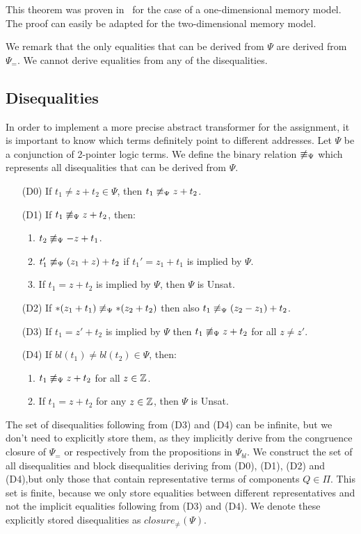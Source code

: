 This theorem was proven in~\cite{2pointer} for the case of a one-dimensional memory model.
The proof can easily be adapted for the two-dimensional memory model.

We remark that the only equalities that can be derived from $\Psi$ are derived from $\Psi_=$. We cannot derive equalities from any of the disequalities.

\subsection{Disequalities}\label{disequalities}

In order to implement a more precise abstract transformer for the assignment, it is important to know which terms definitely
point to different addresses. Let $\Psi$ be a conjunction of 2-pointer logic terms.
We define the binary relation $\not\equiv_\Psi$ which represents all disequalities that can be derived from $\Psi$.

\begin{enumerate}
  \item[(D0)] If $t_1 \neq z + t_2 \in \Psi$, then $t_1 \not\equiv_\Psi z + t_2$.
  \item[(D1)] If $t_1 \not\equiv_\Psi z + t_2$, then:
    \begin{enumerate}
      \item $t_2 \not\equiv_\Psi - z + t_1$.
      \item $t'_1\not\equiv_\Psi (z_1 + z) + t_2$ if $t_1' = z_1 + t_1$ is implied by $\Psi$.
      \item If $t_1 = z + t_2$ is implied by $\Psi$, then $\Psi$ is Unsat.
    \end{enumerate}
  \item[(D2)] If $*(z_1 + t_1) \not\equiv_\Psi *(z_2 + t_2)$ then also $t_1 \not\equiv_\Psi (z_2 - z_1) + t_2$.
  \item[(D3)] If $t_1 = z' + t_2$ is implied by $\Psi$ then $t_1 \not\equiv_\Psi z + t_2$ for all $z \neq z'$.
  \item[(D4)] If $bl(t_1) \neq bl(t_2) \in \Psi$, then:
    \begin{enumerate}
      \item $t_1 \not\equiv_\Psi z + t_2$ for all $z \in \mathbb{Z}$.
      \item If $t_1 = z + t_2$ for any $z \in \mathbb{Z}$, then $\Psi$ is Unsat.
    \end{enumerate}
\end{enumerate}

The set of disequalities following from (D3) and (D4) can be infinite, but we don't need to explicitly store them, as they implicitly derive from the congruence closure of $\Psi_=$ or respectively from the propositions in $\Psi_{bl}$.
We construct the set of all disequalities and block disequalities deriving from (D0), (D1), (D2) and (D4),but only those that contain representative terms of components $Q\in\Pi$.
This set is finite, because we only store equalities between different representatives and not the implicit equalities following from (D3) and (D4).
We denote these explicitly stored disequalities as $closure_\neq(\Psi)$.

